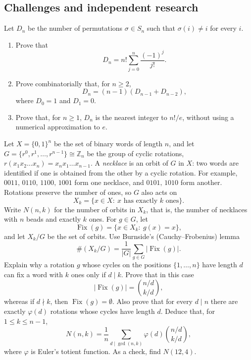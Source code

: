 \documentclass[11pt,a4paper]{article}
\newenvironment{enumeratea}{\begin{enumerate}[label=(\alph*),itemsep=0.28em,topsep=0.25em]}{\end{enumerate}}
\newcounter{problem}[section]
\begin{document}
\subsection*{Challenges and independent research}
\begin{problemstar}[Derangements]
Let $D_n$ be the number of permutations $\sigma\in S_n$ such that $\sigma(i)\ne i$ for every $i$.
\begin{enumeratea}
  \item Prove that
  \[ D_n=n!\sum_{j=0}^{n}\frac{(-1)^j}{j!}. \]
  \item Prove combinatorially that, for $n\ge 2$,
  \[ D_n=(n-1)(D_{n-1}+D_{n-2}), \]
  where $D_0=1$ and $D_1=0$.
  \item Prove that, for $n\ge 1$, $D_n$ is the nearest integer to $n!/e$,
  without using a numerical approximation to $e$.
\end{enumeratea}
\end{problemstar}
\begin{problemstar}
Let $X=\{0,1\}^n$ be the set of binary words of length $n$, and let
$G=\{r^0,r^1,\dots,r^{n-1}\}\cong\mathbb Z_n$ be the group of cyclic rotations,
$r(x_1x_2\dots x_n)=x_nx_1\dots x_{n-1}$. A \emph{necklace} is an orbit of $G$
in $X$: two words are identified if one is obtained from the other by a cyclic
rotation. For example, $0011,\,0110,\,1100,\,1001$ form one necklace, and
$0101,\,1010$ form another. Rotations preserve the number of ones, so $G$ also acts on
\[ X_k=\{x\in X:\ x\text{ has exactly }k\text{ ones}\}. \]
Write $N(n,k)$ for the number of orbits in $X_k$, that is, the number of necklaces
with $n$ beads and exactly $k$ ones.
For $g\in G$, let
\[ \operatorname{Fix}(g)=\{x\in X_k:\ g(x)=x\}, \]
and let $X_k/G$ be the set of orbits. Use Burnside's (Cauchy--Frobenius) lemma
\[ \#(X_k/G)=\frac1{|G|}\sum_{g\in G}|\operatorname{Fix}(g)|. \]
Explain why a rotation $g$ whose cycles on the positions $\{1,\dots,n\}$ have
length $d$ can fix a word with $k$ ones only if $d\mid k$. Prove that in this case
\[ |\operatorname{Fix}(g)|=\binom{n/d}{k/d}, \]
whereas if $d\nmid k$, then $\operatorname{Fix}(g)=\emptyset$. Also prove that
for every $d\mid n$ there are exactly $\varphi(d)$ rotations whose cycles have length $d$.
Deduce that, for $1\le k\le n-1$,
\[ N(n,k)=\frac1n\sum_{d\mid\gcd(n,k)}\varphi(d)\binom{n/d}{k/d}, \]
where $\varphi$ is Euler's totient function. As a check, find $N(12,4)$.
\end{problemstar}
\end{document}
